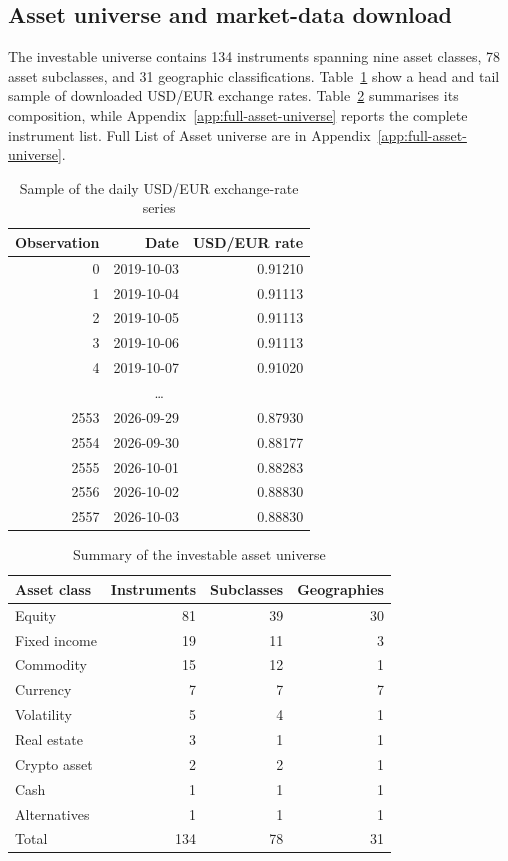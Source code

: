 \documentclass[11pt,a4paper]{article}
\begin{document}
\subsection{Asset universe and market-data download}

The investable universe contains 134 instruments spanning nine asset classes, 78 asset subclasses, and 31 geographic classifications. Table~\ref{tab:usd-eur-rate-sample} show a head and tail sample of downloaded USD/EUR exchange rates. Table~\ref{tab:asset-universe-summary} summarises its composition, while Appendix~\ref{app:full-asset-universe} reports the complete instrument list. Full List of Asset universe are in Appendix~\ref{app:full-asset-universe}.

\begin{table}[H]
  \centering
  \caption{Sample of the daily USD/EUR exchange-rate series}
  \label{tab:usd-eur-rate-sample}
  \begin{tabular}{rrr}
    \toprule
    Observation & Date & USD/EUR rate \\
    \midrule
    0 & 2019-10-03 & 0.91210 \\
    1 & 2019-10-04 & 0.91113 \\
    2 & 2019-10-05 & 0.91113 \\
    3 & 2019-10-06 & 0.91113 \\
    4 & 2019-10-07 & 0.91020 \\
    \multicolumn{3}{c}{\ldots} \\
    2553 & 2026-09-29 & 0.87930 \\
    2554 & 2026-09-30 & 0.88177 \\
    2555 & 2026-10-01 & 0.88283 \\
    2556 & 2026-10-02 & 0.88830 \\
    2557 & 2026-10-03 & 0.88830 \\
    \bottomrule
  \end{tabular}
\end{table}

\begin{table}[H]
  \centering
  \caption{Summary of the investable asset universe}
  \label{tab:asset-universe-summary}
  \begin{tabular}{lrrr}
    \toprule
    Asset class & Instruments & Subclasses & Geographies \\
    \midrule
    Equity & 81 & 39 & 30 \\
    Fixed income & 19 & 11 & 3 \\
    Commodity & 15 & 12 & 1 \\
    Currency & 7 & 7 & 7 \\
    Volatility & 5 & 4 & 1 \\
    Real estate & 3 & 1 & 1 \\
    Crypto asset & 2 & 2 & 1 \\
    Cash & 1 & 1 & 1 \\
    Alternatives & 1 & 1 & 1 \\
    \midrule
    Total & 134 & 78 & 31 \\
    \bottomrule
  \end{tabular}
\end{table}
\end{document}
